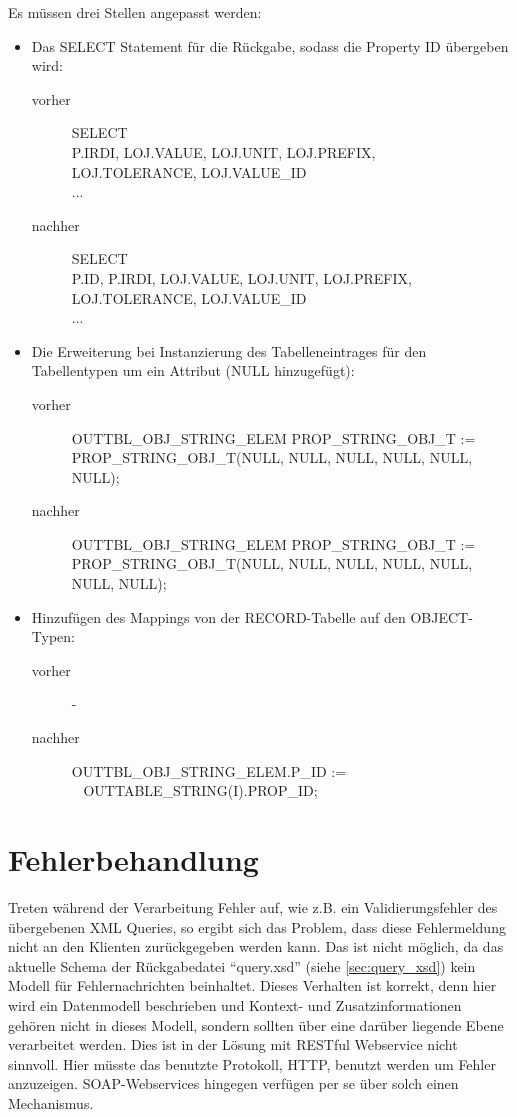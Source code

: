 Es müssen drei Stellen angepasst werden: 

\begin{itemize}
\item Das SELECT Statement für die Rückgabe, sodass die Property ID übergeben wird: 
  \begin{description}
  \item[vorher] SELECT \\
  P.IRDI, LOJ.VALUE, LOJ.UNIT,  LOJ.PREFIX, \\ 
  LOJ.TOLERANCE, LOJ.VALUE\_ID \\
  ...
  \item[nachher] SELECT \\
  P.ID, P.IRDI, LOJ.VALUE, LOJ.UNIT, LOJ.PREFIX, \\ 
  LOJ.TOLERANCE, LOJ.VALUE\_ID \\
  ...
  \end{description}
\item Die Erweiterung bei Instanzierung des Tabelleneintrages für den Tabellentypen um ein Attribut (NULL hinzugefügt): 
  \begin{description}
  \item[vorher] OUTTBL\_OBJ\_STRING\_ELEM  PROP\_STRING\_OBJ\_T :=  \\
  PROP\_STRING\_OBJ\_T(NULL, NULL, NULL, NULL, NULL, NULL);
  \item[nachher] OUTTBL\_OBJ\_STRING\_ELEM  PROP\_STRING\_OBJ\_T :=  \\
  PROP\_STRING\_OBJ\_T(NULL, NULL, NULL, NULL, NULL, NULL, NULL);
  \end{description}
\item Hinzufügen des Mappings von der RECORD-Tabelle auf den OBJECT-Typen:
  \begin{description}
  \item[vorher] -
  \item[nachher] OUTTBL\_OBJ\_STRING\_ELEM.P\_ID := \\~ 
  OUTTABLE\_STRING(I).PROP\_ID;  
  \end{description}
\end{itemize}
 
\section{Fehlerbehandlung}

Treten während der Verarbeitung Fehler auf, wie z.B. ein Validierungsfehler des übergebenen XML Queries, so ergibt sich das Problem, dass diese Fehlermeldung nicht an den Klienten zurückgegeben werden kann. Das ist nicht möglich, da das aktuelle Schema der Rückgabedatei \enquote{query.xsd}  (siehe \autoref{sec:query_xsd}) kein Modell für Fehlernachrichten beinhaltet. Dieses Verhalten ist korrekt, denn hier wird ein Datenmodell beschrieben und Kontext- und Zusatzinformationen gehören nicht in dieses Modell, sondern sollten über eine darüber liegende Ebene verarbeitet werden. Dies ist in der Lösung mit \gls{REST}ful \gls{Webservice} nicht sinnvoll. Hier müsste das benutzte Protokoll, \gls{HTTP}, benutzt werden um Fehler anzuzeigen. \gls{SOAP}-\glspl{Webservice} hingegen verfügen per se über solch einen Mechanismus. 

